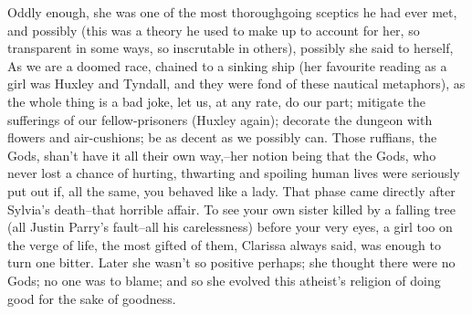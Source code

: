 \documentclass[lang=cn,10pt]{elegantbook}
\begin{document}
Oddly enough, she was one of the most thoroughgoing sceptics he had
ever met, and possibly (this was a theory he used to make up to
account for her, so transparent in some ways, so inscrutable in
others), possibly she said to herself, As we are a doomed race,
chained to a sinking ship (her favourite reading as a girl was
Huxley and Tyndall, and they were fond of these nautical
metaphors), as the whole thing is a bad joke, let us, at any rate,
do our part; mitigate the sufferings of our fellow-prisoners
(Huxley again); decorate the dungeon with flowers and air-cushions;
be as decent as we possibly can.  Those ruffians, the Gods, shan't
have it all their own way,--her notion being that the Gods, who
never lost a chance of hurting, thwarting and spoiling human lives
were seriously put out if, all the same, you behaved like a lady.
That phase came directly after Sylvia's death--that horrible
affair.  To see your own sister killed by a falling tree (all
Justin Parry's fault--all his carelessness) before your very eyes,
a girl too on the verge of life, the most gifted of them, Clarissa
always said, was enough to turn one bitter.  Later she wasn't so
positive perhaps; she thought there were no Gods; no one was to
blame; and so she evolved this atheist's religion of doing good for
the sake of goodness.
\end{document}
